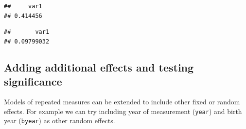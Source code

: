 \documentclass[
  12pt,
]{book}
\newenvironment{Shaded}{\begin{snugshade}}{\end{snugshade}}
\newcommand{\FloatTok}[1]{\textcolor[rgb]{0.00,0.00,0.81}{#1}}
\newcommand{\KeywordTok}[1]{\textcolor[rgb]{0.13,0.29,0.53}{\textbf{#1}}}
\newcommand{\NormalTok}[1]{#1}
\newcommand{\OperatorTok}[1]{\textcolor[rgb]{0.81,0.36,0.00}{\textbf{#1}}}
\newcommand{\StringTok}[1]{\textcolor[rgb]{0.31,0.60,0.02}{#1}}
\begin{document}
\begin{Shaded}
\end{Shaded}

\begin{verbatim}
##     var1 
## 0.414456
\end{verbatim}

\begin{Shaded}
\end{Shaded}

\begin{verbatim}
##       var1 
## 0.09799032
\end{verbatim}

\hypertarget{adding-additional-effects-and-testing-significance-1}{%
\subsection{Adding additional effects and testing significance}\label{adding-additional-effects-and-testing-significance-1}}

Models of repeated measures can be extended to include other fixed or random effects.
For example we can try including year of measurement (\texttt{year}) and birth year (\texttt{byear}) as other random effects.
\end{document}
